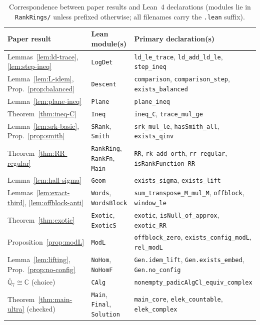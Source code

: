 \documentclass[11pt]{article}
\theoremstyle{definition}
\theoremstyle{remark}
\numberwithin{equation}{section}
\newcommand{\Q}{\mathbb{Q}}
\newcommand{\C}{\mathbb{C}}
\newcommand{\1}{\mathbf{1}}
\newcommand{\code}[1]{{\normalfont\small\texttt{#1}}}
\begin{document}
\begin{table}[ht]
\centering
\caption{Correspondence between paper results and Lean~4 declarations (modules lie in \code{RankRings/} unless prefixed otherwise; all filenames carry the \code{.lean} suffix).}
\label{tab:lean-map}
\footnotesize
\setlength{\tabcolsep}{5pt}
\begin{tabular}{@{}ll>{\raggedright\arraybackslash}p{2.9in}@{}}
\toprule
Paper result & Lean module(s) & Primary declaration(s) \\
\midrule
Lemmas~\ref{lem:ld-trace}, \ref{lem:step-ineq} & \texttt{LogDet} & \texttt{ld\_le\_trace}, \texttt{ld\_add\_ld\_le}, \texttt{step\_ineq} \\
Lemma~\ref{lem:L-idem}, Prop.~\ref{prop:balanced} & \texttt{Descent} & \texttt{comparison}, \texttt{comparison\_step}, \texttt{exists\_balanced} \\
Lemma~\ref{lem:plane-ineq} & \texttt{Plane} & \texttt{plane\_ineq} \\
Theorem~\ref{thm:ineq-C} & \texttt{Ineq} & \texttt{ineq\_C}, \texttt{trace\_mul\_ge} \\
Lemma~\ref{lem:srk-basic}, Prop.~\ref{prop:smith} & \texttt{SRank}, \texttt{Smith} & \texttt{srk\_mul\_le}, \texttt{hasSmith\_all}, \texttt{exists\_qinv} \\
Theorem~\ref{thm:RR-regular} & \texttt{RankRing}, \texttt{RankFn}, \texttt{Main} & \texttt{RR}, \texttt{rk\_add\_orth}, \texttt{rr\_regular}, \texttt{isRankFunction\_RR} \\
Lemma~\ref{lem:hall-sigma} & \texttt{Geom} & \texttt{exists\_sigma}, \texttt{exists\_lift} \\
Lemmas~\ref{lem:exact-third}, \ref{lem:offblock-anti} & \texttt{Words}, \texttt{WordsBlock} & \texttt{sum\_transpose\_M\_mul\_M}, \texttt{offblock}, \texttt{window\_le} \\
Theorem~\ref{thm:exotic} & \texttt{Exotic}, \texttt{ExoticS} & \texttt{exotic}, \texttt{isNull\_of\_approx}, \texttt{exotic\_RR} \\
Proposition~\ref{prop:modL} & \texttt{ModL} & \texttt{offblock\_zero}, \texttt{exists\_config\_modL}, \texttt{rel\_modL} \\
Lemma~\ref{lem:lifting}, Prop.~\ref{prop:no-config} & \texttt{NoHom}, \texttt{NoHomF} & \texttt{Gen.idem\_lift}, \texttt{Gen.exists\_embed}, \texttt{Gen.no\_config} \\
$\overline{\Q}_7 \cong \C$ (choice) & \texttt{CAlg} & \texttt{nonempty\_padicAlgCl\_equiv\_complex} \\
Theorem~\ref{thm:main-ultra} (checked) & \texttt{Main}, \texttt{Final}, \texttt{Solution} & \texttt{main\_core}, \texttt{elek\_countable}, \texttt{elek\_complex} \\

\end{tabular}
\end{table}
\end{document}
